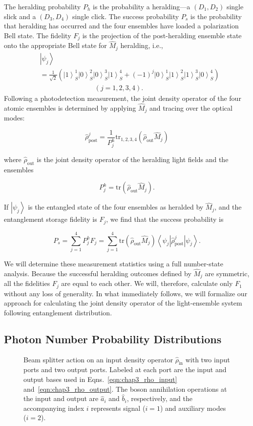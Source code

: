 \documentclass[aps,twocolumn,secnumarabic,amsmath,amssymb,pra,groupedaddress,
showpacs, showkeys,draft]{revtex4-1}
\newcommand{\bra}[1]{\left\langle #1 \right|}
\newcommand{\ket}[1]{\left|#1\right\rangle}
\newcommand{\pna}[1]{\left(#1\right)}
\newcommand{\eqn}[1]{
\begin{equation}
	#1
\end{equation}
}
\begin{document}
The heralding probability $P_{h}$ is the probability a
heralding---a $\pna{D_1, D_2}$ single slick and a $\pna{D_3, D_4}$ single
click. The success probability $P_{s}$ is the probability that
heralding has occurred and the four ensembles have loaded a polarization Bell
state. The fidelity $F_j$ is the projection of the post-heralding ensemble
state onto the appropriate Bell state for $\hat{M}_j$ heralding, i.e.,
\begin{align}
& \ket{\psi_j} \nonumber \\
& =
\frac{1}{\sqrt{2}}\pna{\ket{1}_S^1\ket{0}_S^2\ket{0}_S^3\ket{1}_S^4+\pna{-1}^j
  \ket{0}_S^1\ket{1}_S^2\ket{1}_S^3\ket{0}_S^4} \nonumber \\ & \qquad \qquad
\qquad \qquad \pna{j=1,2,3,4}.\label{eqn:remaining_singlet}
\end{align}
Following a photodetection measurement, the joint density operator of the four
atomic ensembles is determined by applying $\hat{M}_j$ and tracing over the
optical modes:
	\eqn{
	\hat{\rho}_{\textrm{post}}^j=\frac{1}{P_j^{h}}\textrm{tr}_{1,2,3,4}\pna{\hat{\rho}_{\textrm{out}}\hat{M}_j}
	}
	where $\hat{\rho}_{\textrm{out}}$ is the joint density operator of the heralding light fields and the ensembles 
	\eqn{
	P_j^{h}=\textrm{tr}\pna{\hat{\rho}_{\textrm{out}}\hat{M}_j} \label{eqn:herald_prob}.
}
If $\ket{\psi_j}$ is the entangled state of the four ensembles as heralded by
$\hat{M}_j$, and the entanglement storage fidelity is $F_j$, we find that the
success probability is
\eqn{
P_{s} = \sum_{j=1}^4 P_j^{h} F_j =\sum_{j=1}^{4} \textrm{tr}\pna{\hat{\rho}_{\textrm{out}}\hat{M}_j} \bra{\psi_j} \hat{\rho}_{\textrm{post}}^j \ket{\psi_j}.\label{eq:success_prob_def}  
}
We will determine these measurement statistics using a full number-state
analysis. Because the successful heralding outcomes defined by $\hat{M}_j$ are
symmetric, all the fidelities $F_j$ are equal to each other. We will,
therefore, calculate only $F_1$ without any loss of generality.  In what
immediately follows, we will formalize our approach for calculating the joint
density operator of the light-ensemble system following entanglement
distribution.

\subsection{Photon Number Probability Distributions}

\begin{figure}[tb]
	\centering
	\resizebox{3.00in}{!}{}
	\caption{Beam splitter action on an input density operator $\hat{\rho}_{\textrm{in}}$ with two input ports and two output ports. Labeled at each port are the input and output bases used in Eqns.~\ref{eqn:chap3_rho_input} and~\ref{eqn:chap3_rho_output}. The boson annihilation operations at the input and output are $\hat{a}_i$ and $\hat{b}_i$, respectively, and the accompanying index $i$ represents signal ($i=1$) and auxiliary modes ($i=2$).}
	\label{fig:beamsplitter_model}
\end{figure}
\end{document}
